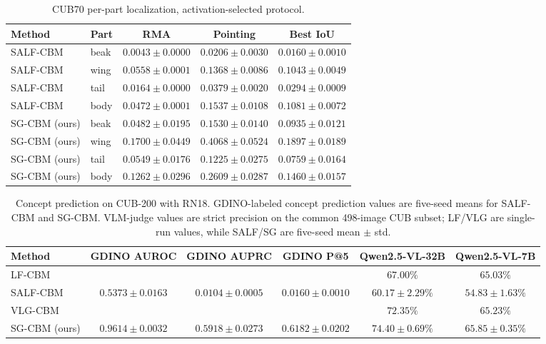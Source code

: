 \begin{table}[h]
\centering
\small
\caption{CUB70 per-part localization, activation-selected protocol.}
\begin{tabular}{llccc}
\toprule
Method & Part & RMA & Pointing & Best IoU \\
\midrule
SALF-CBM & beak & $0.0043 \pm 0.0000$ & $0.0206 \pm 0.0030$ & $0.0160 \pm 0.0010$ \\
SALF-CBM & wing & $0.0558 \pm 0.0001$ & $0.1368 \pm 0.0086$ & $0.1043 \pm 0.0049$ \\
SALF-CBM & tail & $0.0164 \pm 0.0000$ & $0.0379 \pm 0.0020$ & $0.0294 \pm 0.0009$ \\
SALF-CBM & body & $0.0472 \pm 0.0001$ & $0.1537 \pm 0.0108$ & $0.1081 \pm 0.0072$ \\
SG-CBM (ours) & beak & $0.0482 \pm 0.0195$ & $0.1530 \pm 0.0140$ & $0.0935 \pm 0.0121$ \\
SG-CBM (ours) & wing & $0.1700 \pm 0.0449$ & $0.4068 \pm 0.0524$ & $0.1897 \pm 0.0189$ \\
SG-CBM (ours) & tail & $0.0549 \pm 0.0176$ & $0.1225 \pm 0.0275$ & $0.0759 \pm 0.0164$ \\
SG-CBM (ours) & body & $0.1262 \pm 0.0296$ & $0.2609 \pm 0.0287$ & $0.1460 \pm 0.0157$ \\
\bottomrule
\end{tabular}
\end{table}

\begin{table}[h]
\centering
\small
\caption{Concept prediction on CUB-200 with RN18. GDINO-labeled concept prediction values are five-seed means for SALF-CBM and SG-CBM. VLM-judge values are strict precision on the common 498-image CUB subset; LF/VLG are single-run values, while SALF/SG are five-seed mean $\pm$ std.}
\begin{tabular}{lccccc}
\toprule
Method & GDINO AUROC & GDINO AUPRC & GDINO P@5 & Qwen2.5-VL-32B & Qwen2.5-VL-7B \\
\midrule
LF-CBM &  &  &  & $67.00\%$ & $65.03\%$ \\
SALF-CBM & $0.5373 \pm 0.0163$ & $0.0104 \pm 0.0005$ & $0.0160 \pm 0.0010$ & $60.17 \pm 2.29\%$ & $54.83 \pm 1.63\%$ \\
VLG-CBM &  &  &  & $72.35\%$ & $65.23\%$ \\
SG-CBM (ours) & $0.9614 \pm 0.0032$ & $0.5918 \pm 0.0273$ & $0.6182 \pm 0.0202$ & $74.40 \pm 0.69\%$ & $65.85 \pm 0.35\%$ \\
\bottomrule
\end{tabular}
\end{table}

